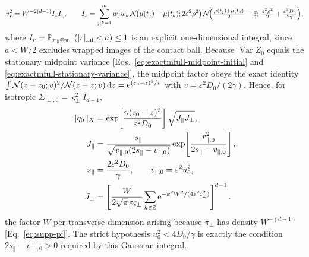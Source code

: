 \begin{remark}
\begin{equation}
 v_*^2=W^{-2(d-1)}I_zI_r,
 \qquad
 I_z=\sum_{j,k=1}^{m}w_jw_k\,
 \mathcal N\!\bigl(\mu(t_j)-\mu(t_k);2\varepsilon^2\rho^2\bigr)\,
 \mathcal N\!\Bigl(\tfrac{\mu(t_j)+\mu(t_k)}{2}-\bar z;\,
 \tfrac{\varepsilon^2\rho^2}{2}+\tfrac{\varepsilon^2D_0}{2\gamma}\Bigr),
 \label{eq:exactmfull-b0-vstar}
\end{equation}
where
\(I_r=\mathbb P_{\pi_\parallel\otimes\pi_\perp}(|r|_{\rm mi}<a)\le1\)
is an explicit one-dimensional integral, since \(a<W/2\) excludes wrapped
images of the contact ball.  Because \(\operatorname{Var}Z_0\) equals the
stationary midpoint variance
[Eqs.~\eqref{eq:exactmfull-midpoint-initial} and
\eqref{eq:exactmfull-stationary-variance}], the midpoint factor obeys the
exact identity
\(\int\mathcal N(z-z_0;v)^2/\mathcal N(z-\bar z;v)\,\mathrm d z
=\mathrm e^{(z_0-\bar z)^2/v}\) with \(v=\varepsilon^2D_0/(2\gamma)\).  Hence,
for isotropic \(\Sigma_{\perp,0}=\varsigma_\perp^2I_{d-1}\),
\begin{equation}
 \begin{aligned}
 \|q_0\|_X
 &=\exp\!\left[\frac{\gamma(z_0-\bar z)^2}
                     {\varepsilon^2D_0}\right]
   \sqrt{J_\parallel J_\perp},\\
 J_\parallel
 &=\frac{s_\parallel}
 {\sqrt{v_{\parallel,0}(2s_\parallel-v_{\parallel,0})}}
 \exp\!\left[
  \frac{r_{\parallel,0}^2}{2s_\parallel-v_{\parallel,0}}
 \right],\\
 s_\parallel&=\frac{2\varepsilon^2D_0}{\gamma},\qquad
 v_{\parallel,0}=\varepsilon^2u_0^2,\\
 J_\perp
 &=\left[\frac{W}{2\sqrt{\pi}\,\varepsilon\varsigma_\perp}
 \sum_{k\in\mathbb Z}
 \mathrm e^{-k^2W^2/(4\varepsilon^2\varsigma_\perp^2)}\right]^{d-1}.
 \end{aligned}
 \label{eq:exactmfull-b0-q0norm}
\end{equation}
the factor \(W\) per transverse dimension arising because \(\pi_\perp\) has
density \(W^{-(d-1)}\) [Eq.~\eqref{eq:supp-pi}].  The strict hypothesis
\(u_0^2<4D_0/\gamma\) is exactly the condition
\(2s_\parallel-v_{\parallel,0}>0\) required by this Gaussian integral.


\end{remark}
